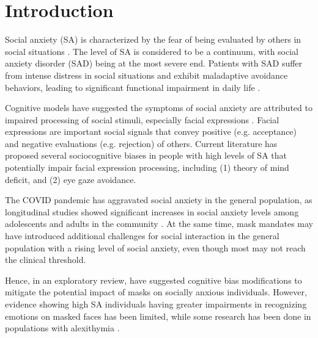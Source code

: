 \section{Introduction}
Social anxiety (SA) is characterized by the fear of being evaluated by others in social situations \citep{leary1997social}. The level of SA is considered to be a continuum, with social anxiety disorder (SAD) being at the most severe end. Patients with SAD suffer from intense distress in social situations and exhibit maladaptive avoidance behaviors, leading to significant functional impairment in daily life \citep{american2013diagnostic}.

Cognitive models have suggested the symptoms of social anxiety are attributed to impaired processing of social stimuli, especially facial expressions \citep{HEIMBERG2014705}. Facial expressions are important social signals that convey positive (e.g. acceptance) and negative evaluations (e.g. rejection) of others. Current literature has proposed several sociocognitive biases in people with high levels of SA that potentially impair facial expression processing, including (1) theory of mind deficit, and (2) eye gaze avoidance.

The COVID pandemic has aggravated social anxiety in the general population, as longitudinal studies showed significant increases in social anxiety levels among adolescents and adults in the community \citep{Hawes_2022}. At the same time, mask mandates may have introduced additional challenges for social interaction in the general population with a rising level of social anxiety, even though most may not reach the clinical threshold.

Hence, in an exploratory review, \citet{Saint03092021} have suggested cognitive bias modifications to mitigate the potential impact of masks on socially anxious individuals. However, evidence showing high SA individuals having greater impairments in recognizing emotions on masked faces has been limited, while some research has been done in populations with alexithymia \citep{bs14040343}.

